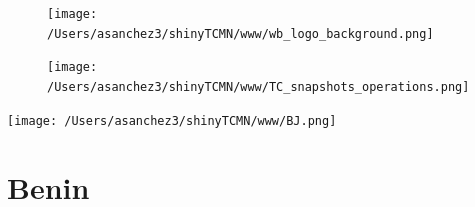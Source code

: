 \documentclass{article}\usepackage[]{graphicx}\usepackage[]{color}
\begin{document}
\newpage

\begin{figure}
  \vspace{-3ex} %
  \hspace{-7ex} %
  \texttt{[image: /Users/asanchez3/shinyTCMN/www/wb\_logo\_background.png]}
\end{figure}
\begin{figure}
  \begin{minipage}[t]{0.99\textwidth} %
      \vspace{-30ex}
      \hspace{-2ex}
      \raggedright{\texttt{[image: /Users/asanchez3/shinyTCMN/www/TC\_snapshots\_operations.png]}}
  \end{minipage}
\end{figure}

\begin{minipage}[t]{0.99\textwidth} %
  \vspace{-1.5cm}
  \begin{minipage}[c]{0.36\textwidth} 
    \begin{minipage}[c]{0.28\textwidth} %
      \texttt{[image: /Users/asanchez3/shinyTCMN/www/BJ.png]}
    \end{minipage}
    \begin{minipage}[c]{0.70\textwidth} %
      \section*{\color{blue!40!black}Benin}
    \end{minipage}
  \end{minipage}
  \begin{minipage}[c]{0.63\textwidth}
    \begin{flushleft}  
    \end{flushleft} 
  \end{minipage}  
\end{minipage} %
\end{document}
